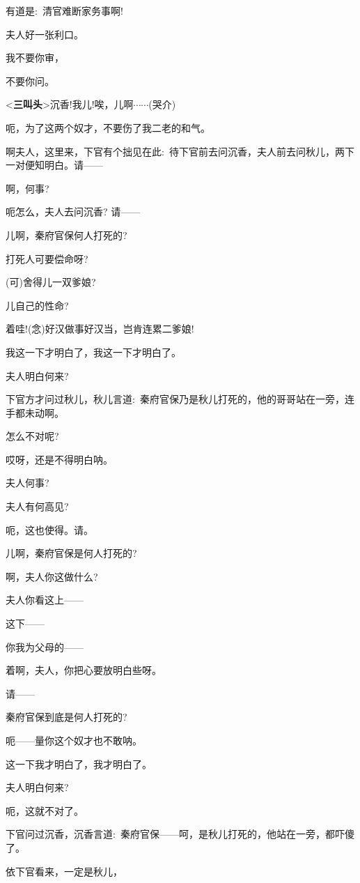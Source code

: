{有道是:~清官难断家务事啊!}

{夫人好一张利口。}

{我不要你审，}

{不要你问。}

{\textless{}{\!\bfseries\akai 三叫头}\!\textgreater{}沉香!我儿!唉，儿啊$\cdots{}\cdots{}$({\hwfs 哭}{\hwfs 介})}

{呃，为了这两个奴才，不要伤了我二老的和气。}

{啊夫人，这里来，下官有个拙见在此:~待下官前去问沉香，夫人前去问秋儿，两下一对便知明白。请------}

{啊，何事?}

{呃怎么，夫人去问沉香? 请------}

{儿啊，秦府官保何人打死的?}

{打死人可要偿命呀?}

{(可)舍得儿一双爹娘?}

{儿自己的性命?}

{着哇!({\akai 念})好汉做事好汉当，岂肯连累二爹娘!}

{我这一下才明白了，我这一下才明白了。}

{夫人明白何来?}

{下官方才问过秋儿，秋儿言道:~秦府官保乃是秋儿打死的，他的哥哥站在一旁，连手都未动啊。}

{怎么不对呢?}

{哎呀，还是不得明白呐。}

{夫人何事?}

{夫人有何高见?}

{呃，这也使得。请。}

{儿啊，秦府官保是何人打死的?}

{啊，夫人你这做什么?}

{夫人你看这上------}

{这下------}\hspace{10pt}~

{你我为父母的------}

{着啊，夫人，你把心要放明白些呀。}

{请------}

{秦府官保到底是何人打死的?}

{呃------量你这个奴才也不敢呐。}

{这一下我才明白了，我才明白了。}

{夫人明白何来?}

{呃，这就不对了。}

{下官问过沉香，沉香言道:~秦府官保------呵，是秋儿打死的，他站在一旁，都吓傻了。}

{依下官看来，一定是秋儿，}

